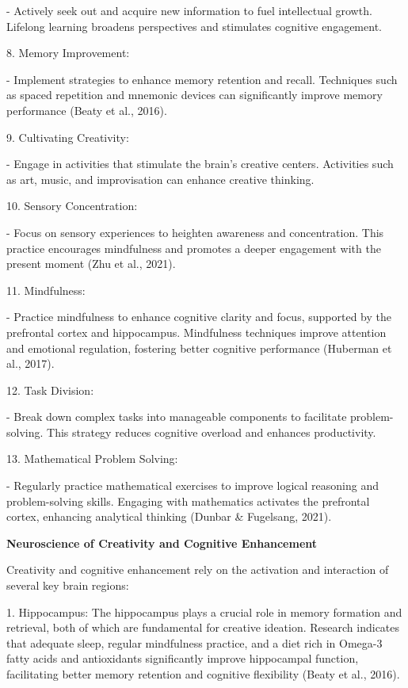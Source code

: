 \documentclass[
]{article}
\begin{document}
- Actively seek out and acquire new information to fuel intellectual
growth. Lifelong learning broadens perspectives and stimulates cognitive
engagement.

8. Memory Improvement:

- Implement strategies to enhance memory retention and recall.
Techniques such as spaced repetition and mnemonic devices can
significantly improve memory\\
performance (Beaty et al., 2016).

9. Cultivating Creativity:

- Engage in activities that stimulate the brain's creative centers.
Activities such as art, music, and improvisation can enhance creative
thinking.

10. Sensory Concentration:

- Focus on sensory experiences to heighten awareness and concentration.
This practice encourages mindfulness and promotes a deeper engagement
with the present moment (Zhu et al., 2021).

11. Mindfulness:

- Practice mindfulness to enhance cognitive clarity and focus, supported
by the prefrontal cortex and hippocampus. Mindfulness techniques improve
attention and emotional regulation, fostering better cognitive
performance (Huberman et al., 2017).

12. Task Division:

- Break down complex tasks into manageable components to facilitate
problem-solving. This strategy reduces cognitive overload and enhances
productivity.

13. Mathematical Problem Solving:

- Regularly practice mathematical exercises to improve logical reasoning
and problem-solving skills. Engaging with mathematics activates the
prefrontal cortex, enhancing analytical thinking (Dunbar \& Fugelsang,
2021).

\textbf{Neuroscience of Creativity and Cognitive Enhancement}

Creativity and cognitive enhancement rely on the activation and
interaction of several key brain regions:

1. Hippocampus: The hippocampus plays a crucial role in memory formation
and retrieval, both of which are fundamental for creative ideation.
Research indicates that adequate sleep, regular mindfulness practice,
and a diet rich in Omega-3 fatty acids and antioxidants significantly
improve hippocampal function, facilitating better memory retention and
cognitive flexibility (Beaty et al., 2016).
\end{document}
